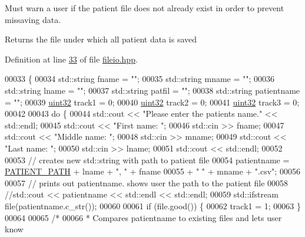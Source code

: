 Must warn a user if the patient file does not already exist in order to prevent missaving data.

\begin{DoxyReturn}{Returns}
the file under which all patient data is saved 
\end{DoxyReturn}


Definition at line \hyperlink{fileio_8hpp_source_l00033}{33} of file \hyperlink{fileio_8hpp_source}{fileio.\+hpp}.


\begin{DoxyCode}
00033                             \{
00034         std::string fname = \textcolor{stringliteral}{""};
00035         std::string mname = \textcolor{stringliteral}{""};
00036         std::string lname = \textcolor{stringliteral}{""};
00037         std::string patfil = \textcolor{stringliteral}{""};
00038         std::string patientname = \textcolor{stringliteral}{""};
00039         \hyperlink{definitions_8hpp_a1134b580f8da4de94ca6b1de4d37975e}{uint32} track1 = 0;
00040         \hyperlink{definitions_8hpp_a1134b580f8da4de94ca6b1de4d37975e}{uint32} track2 = 0;
00041         \hyperlink{definitions_8hpp_a1134b580f8da4de94ca6b1de4d37975e}{uint32} track3 = 0;
00042 
00043         \textcolor{keywordflow}{do} \{
00044             std::cout << \textcolor{stringliteral}{"Please enter the patients name."} << std::endl;
00045             std::cout << \textcolor{stringliteral}{"First name: "};
00046             std::cin >> fname;
00047             std::cout << \textcolor{stringliteral}{"Middle name: "};
00048             std::cin >> mname;
00049             std::cout << \textcolor{stringliteral}{"Last name: "};
00050             std::cin >> lname;
00051             std::cout << std::endl;
00052 
00053             \textcolor{comment}{// creates new std::string with path to patient file}
00054             patientname = \hyperlink{definitions_8hpp_a5736990e7ea949fc1971afa00e421f16}{PATIENT\_PATH} + lname + \textcolor{stringliteral}{", "} + fname
00055                 + \textcolor{stringliteral}{" "} + mname + \textcolor{stringliteral}{".csv"};
00056 
00057             \textcolor{comment}{// prints out patientname. shows user the path to the patient file}
00058             \textcolor{comment}{//std::cout << patientname << std::endl << std::endl;}
00059             std::ifstream file(patientname.c\_str());
00060 
00061             \textcolor{keywordflow}{if} (file.good()) \{
00062                 track1 = 1;
00063             \}
00064 
00065             \textcolor{comment}{/*}
00066 \textcolor{comment}{             * Compares patientname to existing files and lets user know}

\end{DoxyCode}
